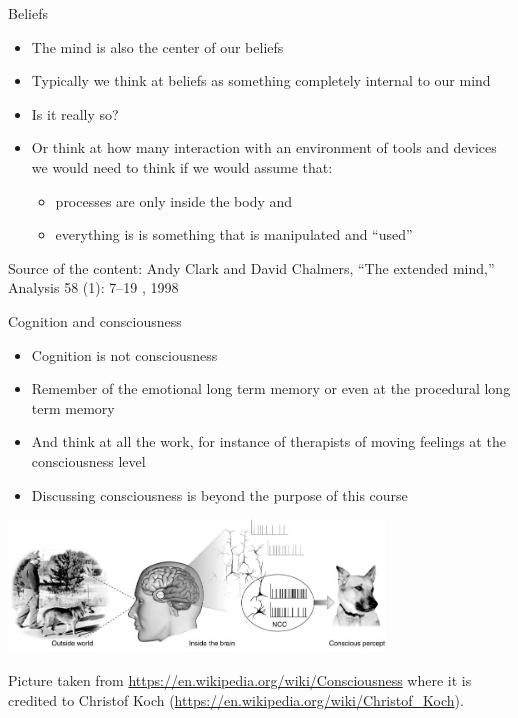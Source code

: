 \documentclass{beamer}
\begin{document}
\begin{frame}
{\centerline{Beliefs}}
\begin{itemize}
    \item The mind is also the center of our beliefs
    \item Typically we think at beliefs as something completely internal to our mind
    \item Is it really so?
     \item Or think at how many interaction with an environment of tools and devices we would need to think if we would assume that:
         \begin{itemize}
    \item processes are only inside the body and 
    \item everything is is something that is manipulated and ``used''
\end{itemize} 
\end{itemize} 

\begin{center}
    \tiny{Source of the content: Andy Clark and David Chalmers, ``The extended mind,'' Analysis 58 (1): 7--19 , 1998}
\end{center}

\end{frame}

\begin{frame}
{\centerline{Cognition and consciousness}}
\begin{itemize}
    \item Cognition is not consciousness
    \item Remember of the emotional long term memory or even at the procedural long term memory
    \item And think at all the work, for instance of therapists of moving feelings at the consciousness level 
    \item Discussing consciousness is beyond the purpose of this course
\end{itemize} 

\begin{center}
 \includegraphics[width=10cm]{P2023.AIBCCSS.ExtendedMindDistributedCognitionSystemicThinking/Neural_Correlates_Of_Consciousness.jpg}
 
 \end{center}

\begin{center}
 \tiny{Picture taken from \url{https://en.wikipedia.org/wiki/Consciousness} where it is credited to Christof Koch (\url{https://en.wikipedia.org/wiki/Christof_Koch}).}
 \end{center}

\end{frame}
\end{document}
